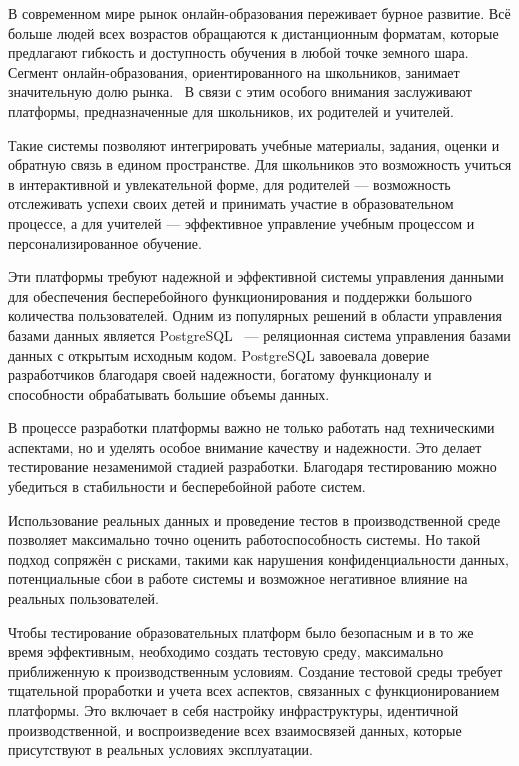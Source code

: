 \introduction %

В современном мире рынок онлайн-образования переживает бурное развитие. Всё больше людей всех возрастов обращаются к дистанционным форматам, которые предлагают гибкость и доступность обучения в любой точке земного шара. Сегмент онлайн-образования, ориентированного на школьников, занимает значительную долю рынка.~\cite{online-edu-research} В связи с этим особого внимания заслуживают платформы, предназначенные для школьников, их родителей и учителей.

Такие системы позволяют интегрировать учебные материалы, задания, оценки и обратную связь в едином пространстве. Для школьников это возможность учиться в интерактивной и увлекательной форме, для родителей — возможность отслеживать успехи своих детей и принимать участие в образовательном процессе, а для учителей — эффективное управление учебным процессом и персонализированное обучение.

Эти платформы требуют надежной и эффективной системы управления данными для обеспечения бесперебойного функционирования и поддержки большого количества пользователей. Одним из популярных решений в области управления базами данных является PostgreSQL~\cite{postgresql} — реляционная система управления базами данных с открытым исходным кодом. PostgreSQL завоевала доверие разработчиков благодаря своей надежности, богатому функционалу и способности обрабатывать большие объемы данных.

В процессе разработки платформы важно не только работать над техническими аспектами, но и уделять особое внимание качеству и надежности. Это делает тестирование незаменимой стадией разработки. Благодаря тестированию можно убедиться в стабильности и бесперебойной работе систем.

Использование реальных данных и проведение тестов в производственной среде позволяет максимально точно оценить работоспособность системы. Но такой подход сопряжён с рисками, такими как нарушения конфиденциальности данных, потенциальные сбои в работе системы и возможное негативное влияние на реальных пользователей.

Чтобы тестирование образовательных платформ было безопасным и в то же время эффективным, необходимо создать тестовую среду, максимально приближенную к производственным условиям. Создание тестовой среды требует тщательной проработки и учета всех аспектов, связанных с функционированием платформы. Это включает в себя настройку инфраструктуры, идентичной производственной, и воспроизведение всех взаимосвязей данных, которые присутствуют в реальных условиях эксплуатации.

